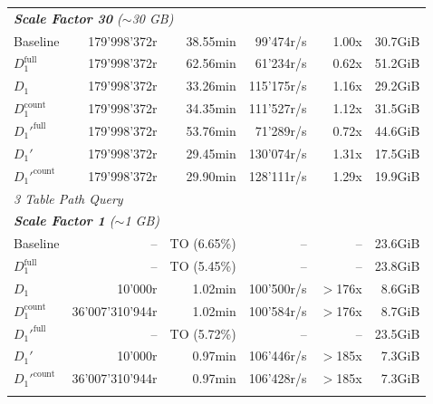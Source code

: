 \begin{longtable}{lrrrrr}
    \multicolumn{6}{l}{\textit{\textbf{Scale Factor 30} ($\sim$30 GB)}} \\
    \nopagebreak
    Baseline              &  179'998'372r         &  38.55min            &  99'474r/s           & 1.00x             & 30.7GiB   \\
    $D_1^{\text{full}}$   &  179'998'372r         &  62.56min            &  61'234r/s           & 0.62x             & 51.2GiB   \\
    \quad $D_1$           &  179'998'372r         &  33.26min            &  115'175r/s          & 1.16x             & 29.2GiB   \\
    $D_1^{\text{count}}$  &  179'998'372r         &  34.35min            &  111'527r/s          & 1.12x             & 31.5GiB   \\
    $D_1'^{\text{full}}$  &  179'998'372r         &  53.76min            &  71'289r/s           & 0.72x             & 44.6GiB   \\
    \quad $D_1'$          &  179'998'372r         &  29.45min            &  130'074r/s          & 1.31x             & 17.5GiB   \\
    $D_1'^{\text{count}}$ &  179'998'372r         &  29.90min            &  128'111r/s          & 1.29x             & 19.9GiB   \\
    \midrule

    \multicolumn{6}{l}{\textit{3 Table Path Query}} \\
    \midrule
    \multicolumn{6}{l}{\textit{\textbf{Scale Factor 1} ($\sim$1 GB)}} \\
    \nopagebreak
    Baseline              &  --                   &  TO (6.65\%)         &  --                  & --                & 23.6GiB   \\
    $D_1^{\text{full}}$   &  --                   &  TO (5.45\%)         &  --                  & --                & 23.8GiB   \\
    \quad $D_1$           &  10'000r              &  1.02min             &  100'500r/s          & $>$176x           & 8.6GiB    \\
    $D_1^{\text{count}}$  &  36'007'310'944r      &  1.02min             &  100'584r/s          & $>$176x           & 8.7GiB    \\
    $D_1'^{\text{full}}$  &  --                   &  TO (5.72\%)         &  --                  & --                & 23.5GiB   \\
    \quad $D_1'$          &  10'000r              &  0.97min             &  106'446r/s          & $>$185x           & 7.3GiB    \\
    $D_1'^{\text{count}}$ &  36'007'310'944r      &  0.97min             &  106'428r/s          & $>$185x           & 7.3GiB    \\
    \addlinespace
    

\end{longtable}
